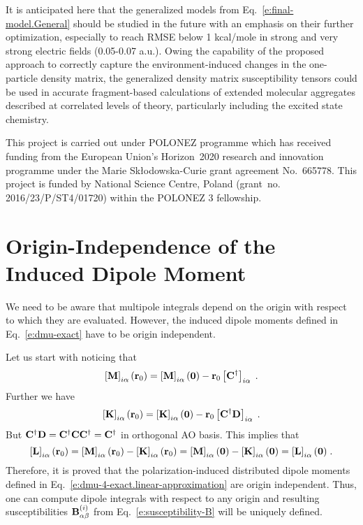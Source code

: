 \documentclass[aip,amsmath,amssymb,reprint]{revtex4-1}
\begin{document}
It is anticipated here that the generalized models from Eq.~\eqref{e:final-model.General}
should be studied in the future with an emphasis 
on their further optimization, especially to reach RMSE below 1 kcal/mole
in strong and very strong electric fields (0.05-0.07 a.u.). 
Owing the capability of the proposed approach to correctly capture the 
environment\hyp{}induced changes in the one\hyp{}particle density matrix, 
the generalized density matrix susceptibility tensors 
could be used in accurate fragment\hyp{}based calculations of extended molecular aggregates
described at correlated levels of theory, particularly including the excited state chemistry.

\begin{acknowledgments}
This project is carried out under POLONEZ programme which has received funding from the European Union's
Horizon~2020 research and innovation programme under the Marie Skłodowska-Curie grant agreement 
No.~665778. This project is funded by National Science Centre, Poland 
(grant~no. 2016/23/P/ST4/01720) within the POLONEZ 3 fellowship.
\end{acknowledgments}

%
\appendix

\section{\label{a:orig-dep} Origin-Independence of the Induced Dipole Moment}

We need to be aware that multipole integrals depend on the origin with respect to which they are evaluated.
However, the induced dipole moments defined in Eq.~\eqref{e:dmu-exact} 
have to be origin independent. 

Let us start with noticing that
%
\begin{equation}
 \left[ {\bf M} \right]_{i\alpha} ({\bf r}_0) 
 = \left[ {\bf M} \right]_{i\alpha} ({\bf 0}) - {\bf r}_0 \left[ {\bf C}^\dagger \right]_{i\alpha}  \;.
\end{equation}
%
Further we have
%
\begin{equation}
 \left[ {\bf K} \right]_{i\alpha} ({\bf r}_0) 
 = \left[ {\bf K} \right]_{i\alpha} ({\bf 0}) - {\bf r}_0 \left[ {\bf C}^\dagger {\bf D} \right]_{i\alpha} \;.
\end{equation}
%
But ${\bf C}^\dagger {\bf D}={\bf C}^\dagger {\bf C} {\bf C}^\dagger={\bf C}^\dagger$ in orthogonal
AO basis. This implies that
%
\begin{equation}
   \left[ {\bf L} \right]_{i\alpha} ({\bf r}_0) 
 = \left[ {\bf M} \right]_{i\alpha} ({\bf r}_0) - \left[ {\bf K} \right]_{i\alpha} ({\bf r}_0)
 = \left[ {\bf M} \right]_{i\alpha} ({\bf 0})   - \left[ {\bf K} \right]_{i\alpha} ({\bf 0})
 = \left[ {\bf L} \right]_{i\alpha} ({\bf 0}) \;.
\end{equation}
%
Therefore, it is proved that the polarization\hyp{}induced distributed dipole moments 
defined in Eq.~\eqref{e:dmu-4-exact.linear-approximation} 
are origin independent.
Thus, one can compute dipole integrals with respect to any origin and resulting
susceptibilities ${\bf B}_{\alpha\beta}^{(i)}$ from Eq.~\eqref{e:susceptibility-B} will be uniquely defined.
\end{document}
